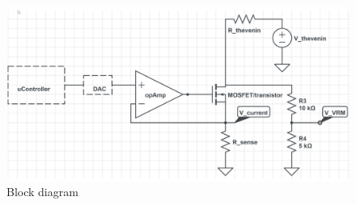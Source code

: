 \documentclass[a4paper,11pt]{article}%
\begin{document}
\begin{figure}[H]
	\centering
	\includegraphics[scale=0.38]{figures/vrm_block_diagram.png}
  \caption{Block diagram}
\end{figure}
\end{document}
